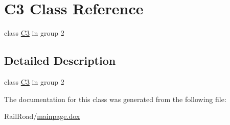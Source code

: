 \hypertarget{class_c3}{\section{C3 Class Reference}
\label{class_c3}
}


class \hyperlink{class_c3}{C3} in group 2  




\subsection{Detailed Description}
class \hyperlink{class_c3}{C3} in group 2 

The documentation for this class was generated from the following file\-:\begin{DoxyCompactItemize}
\item 
Rail\-Road/\hyperlink{mainpage_8dox}{mainpage.\-dox}\end{DoxyCompactItemize}

